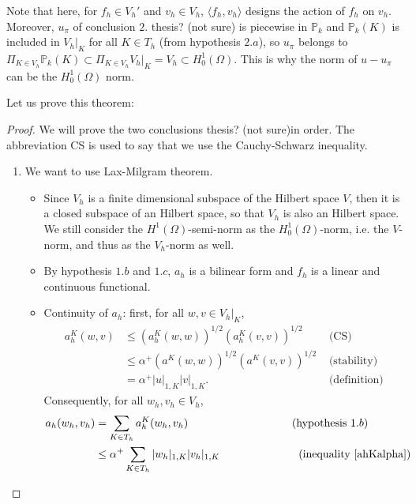 \begin{remark}
Note that here, for $f_h\in V_h'$ and $v_h \in V_h$, $\langle f_h,v_h\rangle$ designs the action of $f_h$ on $v_h$. Moreover, $u_\pi$ of conclusion $2.${\color{red} thesis? (not sure)} is piecewise in $\mathbb{P}_k$ and $\mathbb{P}_k(K)$ is included in $V_h|_K$ for all $K\in T_h$ (from hypothesis $2.a$), so $u_\pi$ belongs to $\Pi_{K\in V_h} \mathbb{P}_k(K) \subset \Pi_{K\in V_h} V_h|_K = V_h \subset H_0^1(\Omega)$. This is why the norm of $u-u_\pi$ can be the $H_0^1(\Omega)$ norm. 
\end{remark}

\noindent Let us prove this theorem:
\begin{proof}
We will prove the two conclusions {\color{red} thesis? (not sure)}in order. The abbreviation CS is used to say that we use the Cauchy-Schwarz inequality.
\begin{enumerate}
\item We want to use Lax-Milgram theorem. 
\begin{itemize}
\item Since $V_h$ is a finite dimensional subspace of the Hilbert space $V$, then it is a closed subspace of an Hilbert space, so that $V_h$ is also an Hilbert space. We still consider the $H^1(\Omega)$-semi-norm as the $H_0^1(\Omega)$-norm, i.e. the $V$-norm, and thus as the $V_h$-norm as well.
\item By hypothesis $1.b$ and $1.c$, $a_h$ is a bilinear form and $f_h$ is a linear and continuous functional.
\item Continuity of $a_h$: first, for all $w,v\in V_h|_K$, 
\begin{align}
a_h^K(w,v) &\leq \left( a_h^K\left( w,w \right)\right)^{1/2}\left( a_h^K\left (v,v \right)\right)^{1/2} &\text{ (CS)} \nonumber \\
&\leq \alpha^+\left( a^K\left( w,w \right)\right)^{1/2}\left( a^K\left (v,v \right)\right)^{1/2} &\text{ (stability)} \nonumber \\
&= \alpha^+|u|_{1,K}|v|_{1,K}. &\text{ (definition)} \label{ahKalpha}
\end{align}
Consequently, for all $w_h, v_h \in V_h$, 
\begin{align*}
a_h(w_h,v_h) &= \sum_{K\in T_h} a_h^K(w_h,v_h) \hspace{3.2cm} \text{ (hypothesis }1.b)\\
&\leq \alpha^+\sum_{K\in T_h} |w_h|_{1,K}|v_h|_{1,K} \hspace{2.4cm}\text{ (inequality \ref{ahKalpha})}\\

\end{align*}
\end{itemize}
\end{enumerate}
\end{proof}
